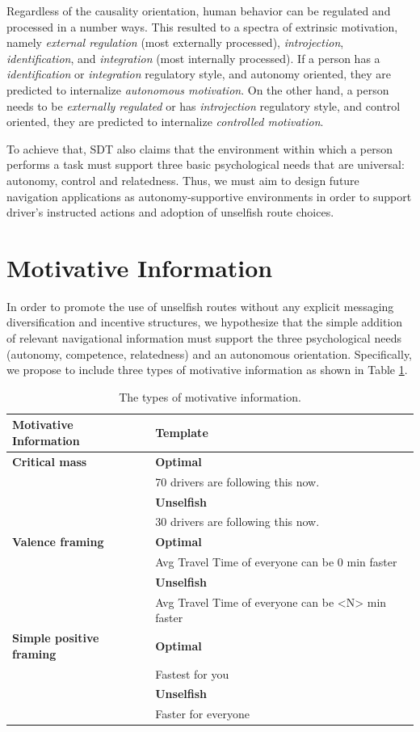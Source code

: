 Regardless of the causality orientation, human behavior can be regulated and processed in a number ways. This resulted to a spectra of extrinsic motivation, namely \textit{external regulation} (most externally processed), \textit{introjection}, \textit{identification}, and \textit{integration} (most internally processed). If a person has a \textit{identification} or \textit{integration} regulatory style, and autonomy oriented, they are predicted to internalize \textit{autonomous motivation}. On the other hand, a person needs to be \textit{externally regulated} or has \textit{introjection} regulatory style, and control oriented, they are predicted to internalize \textit{controlled motivation}. 

To achieve that, SDT also claims that the environment within which a person performs a task must support three basic psychological needs that are universal: autonomy, control and relatedness. Thus, we must aim to design future navigation applications as autonomy-supportive environments in order to support driver's instructed actions and adoption of unselfish route choices.

\section{Motivative Information}
In order to promote the use of unselfish routes without any explicit messaging diversification and incentive structures, we hypothesize that the simple addition of relevant navigational information must support the three psychological needs (autonomy, competence, relatedness) and an autonomous orientation. Specifically, we propose to include three types of motivative information as shown in Table \ref{tab:motive-info}. 

\begin{table}[h]
    \caption{The types of motivative information.}
	\label{tab:motive-info}
	\centering
	\begin{tabular}{l l}
	    \hline\hline
		\textbf{Motivative Information} & \textbf{Template} \\
		\hline
		\textbf{Critical mass} & \textbf{Optimal} \\
		& 70 drivers are following this now. \\
		& \textbf{Unselfish} \\
		& 30 drivers are following this now. \\
        \textbf{Valence framing} & \textbf{Optimal} \\
        & Avg Travel Time of everyone can be 0 min faster \\
		& \textbf{Unselfish} \\
		& Avg Travel Time of everyone can be <N> min faster \\
        \textbf{Simple positive framing} & \textbf{Optimal} \\
        & Fastest for you \\
		& \textbf{Unselfish} \\
		& Faster for everyone \\
		\hline
	\end{tabular}
\end{table}


